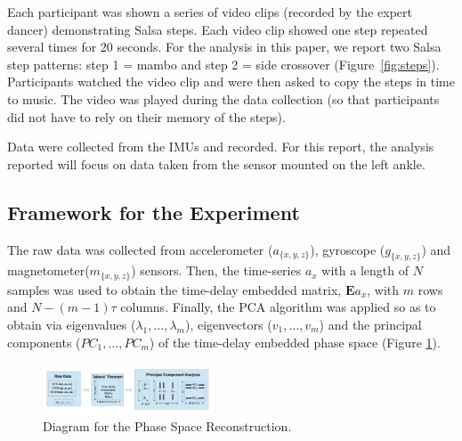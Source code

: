 \documentclass[10pt,journal,compsoc]{IEEEtran}
\begin{document}
Each participant was shown a series of video clips 
(recorded by the expert dancer) demonstrating Salsa steps. 
Each video clip showed one step repeated several times for 
20 seconds. For the analysis in this paper, we report two 
Salsa step patterns:  step 1 = mambo and step 2 = side 
crossover (Figure~\ref{fig:steps}). Participants watched the video clip 
and were then asked to copy the steps in time to music. 
The video was played during the data collection (so that 
participants did not have to rely on their memory of the 
steps).

Data were collected from the IMUs and recorded. For 
this report, the analysis reported will focus on data 
taken from the sensor mounted on the left ankle.


\subsection{Framework for the Experiment}
The raw data was collected from accelerometer ($a_{ \{ x,y,z \} }$), 
gyroscope ($g_{ \{ x,y,z \} }$) and magnetometer($m_{ \{ x,y,z \} }$) sensors. 
Then, the time-series $a_x$ with a length of $N$ samples was 
used to obtain the time-delay embedded matrix, $\boldsymbol{E} a_{x}$, 
with $m$ rows and $N-(m-1)\tau$ columns. Finally, the 
PCA algorithm was applied so as to obtain via eigenvalues 
($\lambda_1,\ldots,\lambda_m$), eigenvectors ($v_1,\ldots,v_m$) and the principal 
components ($PC_1,\ldots,PC_m$) of the time-delay embedded 
phase space (Figure \ref{fig:raw_takens_pca}).
\begin{figure}[!htb]
\centering
\includegraphics[width=0.45\textwidth]{diagram_v10}
\caption[PA]{Diagram for the Phase Space Reconstruction.}
\label{fig:raw_takens_pca}
\end{figure}
\end{document}
